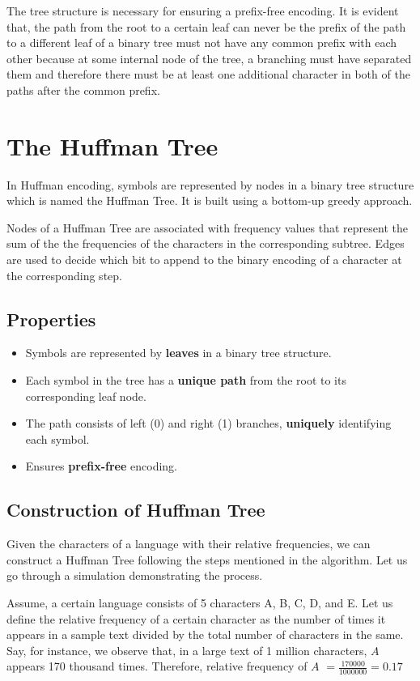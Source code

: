 \documentclass[18pt]{article}
\begin{document}
	The tree structure is necessary for ensuring a prefix-free encoding. It is evident that, the path from the root to a certain leaf can never be the prefix of the path to a different leaf of a binary tree must not have any common prefix with each other because at some internal node of the tree, a branching must have separated them and therefore there must be at least one additional character in both of the paths after the common prefix.
	
	
	\section{The Huffman Tree}
	
	In Huffman encoding, symbols are represented by nodes in a binary
	tree structure which is named the Huffman Tree. It is built using a bottom-up greedy approach.
	
	Nodes of a Huffman Tree are associated with frequency values that represent the sum of the the frequencies of the characters in the corresponding subtree. Edges are used to decide which bit to append to the binary encoding of a character at the corresponding step.
	
	\subsection{Properties}
	
	\begin{itemize}
		\item Symbols are represented by \textbf{leaves} in a binary tree structure.
		\item Each symbol in the tree has a \textbf{unique path} from the root to its corresponding leaf node.
		\item The path consists of left (0) and right (1) branches, \textbf{uniquely} identifying each symbol.
		\item Ensures \textbf{prefix-free} encoding.
	\end{itemize}
	
	\subsection{Construction of Huffman Tree}
	
	Given the characters of a language with their relative frequencies, we can construct a Huffman Tree following the steps mentioned in the algorithm. Let us go through a simulation demonstrating the process.
	
	Assume, a certain language consists of 5 characters A, B, C, D, and E. Let us define the relative frequency of a certain character as the number of times it appears in a sample text divided by the total number of characters in the same. Say, for instance, we observe that, in a large text of 1 million characters, $A$ appears 170 thousand times. Therefore, relative frequency of $A$ $ = \frac{170000}{1000000} = 0.17$
	
\end{document}
